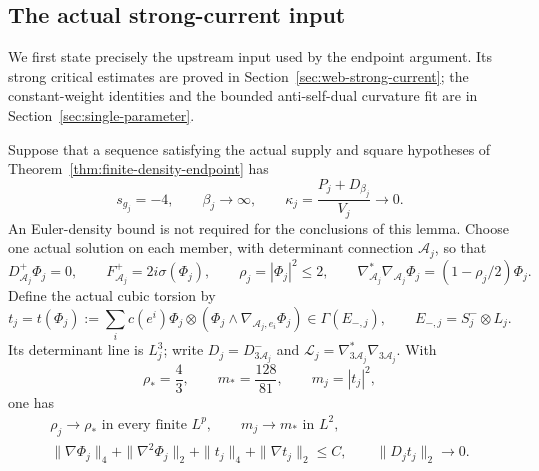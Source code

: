 \subsection{The actual strong-current input}

We first state precisely the upstream input used by the endpoint
argument.  Its strong critical estimates are proved in
Section~\ref{sec:web-strong-current}; the constant-weight identities
and the bounded anti-self-dual curvature fit are in
Section~\ref{sec:single-parameter}.

\begin{lemma}
\label{lem:finite-density-strong-current}
Suppose that a sequence satisfying the actual supply and square
hypotheses of Theorem~\ref{thm:finite-density-endpoint} has
\begin{equation}
 s_{g_j}=-4,\qquad \beta_j\longrightarrow\infty,\qquad
 \kappa_j=\frac{P_j+D_{\beta_j}}{V_j}\longrightarrow0.
 \label{eq:finite-density-zero-sequence}
\end{equation}
An Euler-density bound is not required for the conclusions of this
lemma.  Choose one actual solution on each member, with determinant
connection $\mathcal A_j$, so that
\begin{equation}
 D_{\mathcal A_j}^+\Phi_j=0,\qquad
 F_{\mathcal A_j}^+=2i\sigma(\Phi_j),\qquad
 \rho_j=|\Phi_j|^2\le2,
 \qquad
 \nabla_{\mathcal A_j}^*\nabla_{\mathcal A_j}\Phi_j
       =(1-\rho_j/2)\Phi_j.
 \label{eq:finite-density-actual-equations}
\end{equation}
Define the actual cubic torsion by
\begin{equation}
 t_j=t(\Phi_j):=\sum_i c(e^i)\Phi_j\otimes
       (\Phi_j\wedge\nabla_{\mathcal A_j,e_i}\Phi_j)
       \in\Gamma(E_{-,j}),\qquad E_{-,j}=S_j^-\otimes L_j.
 \label{eq:finite-density-cubic-torsion}
\end{equation}
Its determinant line is $L_j^3$; write $D_j=D^-_{3\mathcal A_j}$
and $\mathcal L_j=\nabla_{3\mathcal A_j}^*\nabla_{3\mathcal A_j}$.
With
\[
 \rho_*=\frac43,\qquad m_*=\frac{128}{81},\qquad m_j=|t_j|^2,
\]
one has
\begin{gather}
 \rho_j\longrightarrow\rho_* \text{ in every finite }L^p,
 \qquad m_j\longrightarrow m_* \text{ in }L^2,
 \label{eq:finite-density-strong-masses}\\
 \|\nabla\Phi_j\|_4+\|\nabla^2\Phi_j\|_2+
 \|t_j\|_4+\|\nabla t_j\|_2\le C,
 \qquad \|D_jt_j\|_2\longrightarrow0.
 \label{eq:finite-density-strong-bounds}
\end{gather}

\end{lemma}
